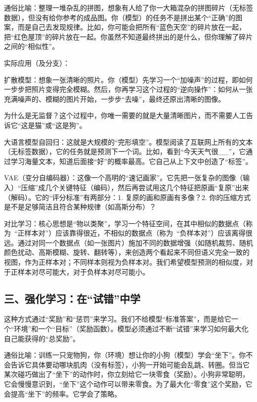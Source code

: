 通俗比喻：整理一堆杂乱的拼图，想象有人给了你一大箱混杂的拼图碎片（无标签数据），但没有给你参考的成品图。你（模型）的任务不是拼出某个``正确''的图案，而是自己去发现规律。比如，你可能会把所有``蓝色天空''的碎片放在一起，把``红色屋顶''的碎片放在一起。你虽然不知道最终拼出的是什么，但你理解了碎片之间的``相似性''。

实际应用（及分支）：

扩散模型：想象一张清晰的照片。你（模型）先学习一个``加噪声''的过程，即如何一步步把照片变得完全模糊。然后，你再学习这个过程的``逆向操作''：如何从一张充满噪声的、模糊的图片开始，一步步``去噪''，最终还原出清晰的图像。

为什么是无监督？这个过程中，你唯一需要的就是大量清晰图片，而不需要人工告诉它``这是猫''或``这是狗''。

大语言模型自回归：这就是大规模的``完形填空''。模型阅读了互联网上所有的文本（无标签数据），它的任务就是预测下一个词。比如，看到``今天天气很\_\_''，它通过学习海量文本，知道后面接``好''的概率最高。它自己从上下文中创造了``标签''。

VAE（变分自编码器）：这像一个高明的``速记画家''。它先把一张复杂的图像（输入）``压缩''成几个关键特征（编码），然后再尝试用这几个特征把原画``复原''出来（解码）。它的``评分标准''有两部分：1. 复原的画和原画有多像？2. 你的压缩方式是不是足够简洁且符合某种规律（如高斯分布）？

对比学习：核心思想是``物以类聚''，学习一个特征空间，在其中相似的数据点（称为~``正样本对''）应该靠得很近，不相似的数据点（称为~``负样本对''）应该离得很远。通过对同一个数据点（如一张图片）施加不同的数据增强（如随机裁剪、随机颜色扰动、高斯模糊、旋转、翻转等），来创造两个看起来不同但语义完全一致的视图，作为正样本对；不同样本则视为负样本对。我们希望模型预测的相似度，对于正样本对尽可能大，对于负样本对尽可能小。

\hypertarget{ux4e09ux5f3aux5316ux5b66ux4e60ux5728ux8bd5ux9519ux4e2dux5b66}{%
\subsection{三、强化学习：在``试错''中学}\label{ux4e09ux5f3aux5316ux5b66ux4e60ux5728ux8bd5ux9519ux4e2dux5b66}}

这种方式通过``奖励''和``惩罚''来学习。我们不给模型``标准答案''，而是给它一个``环境''和一个``目标''（奖励函数）。模型必须通过不断``试错''来学习如何最大化自己能获得的``总奖励''。

通俗比喻：训练一只宠物狗，你（环境）想让你的小狗（模型）学会``坐下''。你不会告诉它具体要动哪块肌肉（没有标签），小狗一开始可能会乱跳、转圈。但当它某次碰巧做出了``坐下''的动作时，你立刻给它一块零食（奖励）。小狗非常聪明，它会慢慢意识到，``坐下''这个动作可以带来零食。为了最大化``零食''这个奖励，它会提高``坐下''的频率。它学会了策略。

